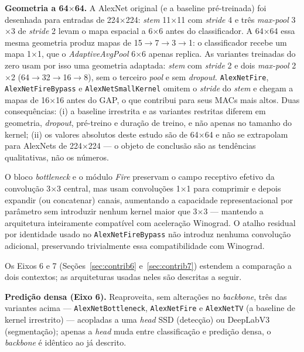 \documentclass[conference]{IEEEtran}
\begin{document}
\textbf{Geometria a 64$\times$64.} A AlexNet original (e a baseline pré-treinada) foi desenhada
para entradas de 224$\times$224: \textit{stem} 11$\times$11 com \textit{stride} 4 e três
\textit{max-pool} 3$\times$3 de \textit{stride} 2 levam o mapa espacial a 6$\times$6 antes do
classificador. A 64$\times$64 essa mesma geometria produz mapas de 15$\to$7$\to$3$\to$1: o
classificador recebe um mapa 1$\times$1, que o \textit{AdaptiveAvgPool} 6$\times$6 apenas replica.
As variantes treinadas do zero usam por isso uma geometria adaptada: \textit{stem} com
\textit{stride} 2 e dois \textit{max-pool} 2$\times$2 (64$\to$32$\to$16$\to$8), sem o terceiro
\textit{pool} e sem \textit{dropout}. \texttt{AlexNetFire}, \texttt{AlexNetFireBypass} e
\texttt{AlexNetSmallKernel} omitem o \textit{stride} do \textit{stem} e chegam a mapas de
16$\times$16 antes do GAP, o que contribui para seus MACs mais altos. Duas consequências:
(i) a baseline irrestrita e as variantes restritas diferem em geometria, \textit{dropout},
pré-treino e duração de treino, e não apenas no tamanho do kernel; (ii) os valores absolutos deste
estudo são de 64$\times$64 e não se extrapolam para AlexNets de 224$\times$224 — o objeto de
conclusão são as tendências qualitativas, não os números.

O bloco \textit{bottleneck} e o módulo \textit{Fire} preservam o campo receptivo efetivo da
convolução 3$\times$3 central, mas usam convoluções 1$\times$1 para comprimir e depois expandir (ou
concatenar) canais, aumentando a capacidade representacional por parâmetro sem introduzir nenhum
kernel maior que 3$\times$3 — mantendo a arquitetura inteiramente compatível com aceleração
Winograd. O atalho residual por identidade usado no \texttt{AlexNetFireBypass} não introduz
nenhuma convolução adicional, preservando trivialmente essa compatibilidade com Winograd.

Os Eixos 6 e 7 (Seções~\ref{sec:contrib6} e~\ref{sec:contrib7}) estendem a comparação a dois
contextos; as arquiteturas usadas neles são descritas a seguir.

\textbf{Predição densa (Eixo 6).} Reaproveita, sem alterações no \textit{backbone}, três
das variantes acima — \texttt{AlexNetBottleneck}, \texttt{AlexNetFire} e \texttt{AlexNetTV} (a
baseline de kernel irrestrito) — acopladas a uma \textit{head} SSD \cite{liu2016ssd} (detecção) ou
DeepLabV3 \cite{chen2017rethinking} (segmentação); apenas a \textit{head} muda entre classificação
e predição densa, o \textit{backbone} é idêntico ao já descrito.
\end{document}

